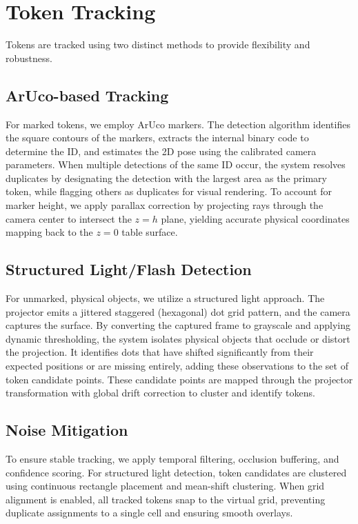 \documentclass[11pt,a4paper]{article}
\begin{document}
\section{Token Tracking}

Tokens are tracked using two distinct methods to provide flexibility and robustness.

\subsection{ArUco-based Tracking}
For marked tokens, we employ ArUco markers. The detection algorithm identifies the square contours of the markers, extracts the internal binary code to determine the ID, and estimates the 2D pose using the calibrated camera parameters. When multiple detections of the same ID occur, the system resolves duplicates by designating the detection with the largest area as the primary token, while flagging others as duplicates for visual rendering. To account for marker height, we apply parallax correction by projecting rays through the camera center to intersect the $z=h$ plane, yielding accurate physical coordinates mapping back to the $z=0$ table surface.

\subsection{Structured Light/Flash Detection}
For unmarked, physical objects, we utilize a structured light approach. The projector emits a jittered staggered (hexagonal) dot grid pattern, and the camera captures the surface. By converting the captured frame to grayscale and applying dynamic thresholding, the system isolates physical objects that occlude or distort the projection. It identifies dots that have shifted significantly from their expected positions or are missing entirely, adding these observations to the set of token candidate points. These candidate points are mapped through the projector transformation with global drift correction to cluster and identify tokens.

\subsection{Noise Mitigation}
To ensure stable tracking, we apply temporal filtering, occlusion buffering, and confidence scoring. For structured light detection, token candidates are clustered using continuous rectangle placement and mean-shift clustering. When grid alignment is enabled, all tracked tokens snap to the virtual grid, preventing duplicate assignments to a single cell and ensuring smooth overlays.
\end{document}
